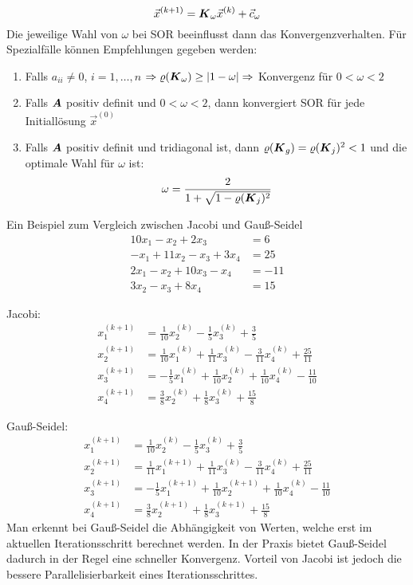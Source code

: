 \begin{enumerate}
	\[\vec{x}^{(k + 1)} = \boldsymbol {K}_\omega \vec{x}^{(k)} + \vec{c}_\omega\]
	Die jeweilige Wahl von $\omega$ bei SOR beeinflusst dann das Konvergenzverhalten. Für Spezialfälle können Empfehlungen gegeben werden:
	\begin{enumerate}
		\item Falls $a_{ii} \ne 0$, $i = 1, \dots, n$ $\Rightarrow \varrho(\boldsymbol {K}_\omega) \ge |1 - \omega| \Rightarrow$ Konvergenz für $0 < \omega < 2$
		\item Falls $\boldsymbol {A}$ positiv definit und $0 < \omega < 2$, dann konvergiert SOR für jede Initiallösung $\vec{x}^{(0)}$
		\item Falls $\boldsymbol {A}$ positiv definit und tridiagonal ist, dann $\varrho(\boldsymbol {K}_g) = \varrho(\boldsymbol {K}_j)^2 < 1$ und die optimale Wahl für $\omega$ ist:
		\[\omega = \frac{2}{1 + \sqrt{1 - \varrho(\boldsymbol {K}_j)^2}}\]
	\end{enumerate}
\end{enumerate}
Ein Beispiel zum Vergleich zwischen Jacobi und Gauß-Seidel
\begin{align}
10 x_1 - x_2 + 2 x_3 &= 6 \\
- x_1 + 11 x_2 - x_3 + 3 x_4 &= 25 \\
2 x_1 - x_2 + 10 x_3 - x_4 &= -11 \\
3 x_2 - x_3 + 8 x_4 &= 15
\end{align}

Jacobi:
\begin{align}
	x_1^{(k + 1)} &= \frac{1}{10} x_2^{(k)} - \frac{1}{5} x_3^{(k)} + \frac{3}{5} \\
	x_2^{(k + 1)} &= \frac{1}{10} x_1^{(k)} + \frac{1}{11} x_3^{(k)} - \frac{3}{11} x_4^{(k)} + \frac{25}{11} \\
	x_3^{(k + 1)} &=  -\frac{1}{5} x_1^{(k)} + \frac{1}{10} x_2^{(k)} + \frac{1}{10} x_4^{(k)} - \frac{11}{10} \\
	x_4^{(k + 1)} &= \frac{3}{8} x_2^{(k)} + \frac{1}{8} x_3^{(k)} + \frac{15}{8}
\end{align}

Gauß-Seidel:
\begin{align}
x_1^{(k + 1)} &= \frac{1}{10} x_2^{(k)} - \frac{1}{5} x_3^{(k)} + \frac{3}{5} \\
x_2^{(k + 1)} &= \frac{1}{11} x_1^{(k + 1)} + \frac{1}{11} x_3^{(k)} - \frac{3}{11} x_4^{(k)} + \frac{25}{11} \\
x_3^{(k + 1)} &= -\frac{1}{5} x_1^{(k + 1)} + \frac{1}{10} x_2^{(k + 1)} + \frac{1}{10} x_4^{(k)} - \frac{11}{10} \\
x_4^{(k + 1)} &= \frac{3}{8} x_2^{(k + 1)} + \frac{1}{8} x_3^{(k + 1)} + \frac{15}{8}
\end{align}
Man erkennt bei Gauß-Seidel die Abhängigkeit von Werten, welche erst im aktuellen Iterationsschritt berechnet werden. In der Praxis bietet Gauß-Seidel dadurch in der Regel eine schneller Konvergenz. Vorteil von Jacobi ist jedoch die bessere Parallelisierbarkeit eines Iterationsschrittes.

